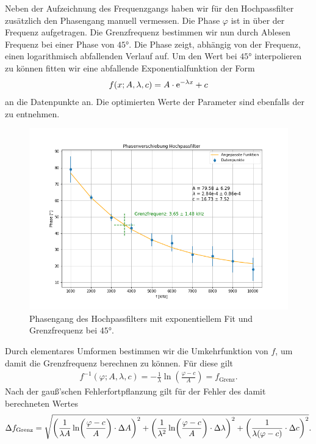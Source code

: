 Neben der Aufzeichnung des Frequenzgangs haben wir für den Hochpassfilter zusätzlich den Phasengang manuell vermessen. Die Phase $\varphi$ ist in  über der Frequenz aufgetragen. Die Grenzfrequenz bestimmen wir nun durch Ablesen Frequenz bei einer Phase von $45\si{\degree}$. Die Phase zeigt, abhängig von der Frequenz, einen logarithmisch abfallenden Verlauf auf. Um den Wert bei $45\si{\degree}$ interpolieren zu können fitten wir eine abfallende Exponentialfunktion der Form
\begin{align}
  f(x; A,\lambda,c) = A \cdot \text{e}^{- \lambda x} + c
\end{align}
an die Datenpunkte an. Die optimierten Werte der Parameter sind ebenfalls der  zu entnehmen.


\begin{figure}[H]
  \centering
  \includegraphics[width=.8\textwidth]{files/phaseshift_hp_fit.png}
  \caption{Phasengang des Hochpassfilters mit exponentiellem Fit und Grenzfrequenz bei $45\si{\degree}$.}
  \label{fig:phaseshift_hp_fit}
\end{figure}


Durch elementares Umformen bestimmen wir die Umkehrfunktion von $f$, um damit die Grenzfrequenz berechnen zu können. Für diese gilt
\begin{align}
  f^{-1}(\varphi; A, \lambda, c) = - \frac{1}{\lambda} \ln(\frac{\varphi - c}{A}) = f_{\mathrm{Grenz}}.
\end{align}
Nach der gauß'schen Fehlerfortpflanzung gilt für der Fehler des damit berechneten Wertes
\begin{align}
  \Delta f_{\mathrm{Grenz}} = \sqrt{\qty(\frac{1}{\lambda A} \ln(\frac{\varphi - c}{A}) \cdot \Delta A)^{2} + \qty(\frac{1}{\lambda^2} \ln(\frac{\varphi - c}{A}) \cdot \Delta \lambda)^{2} + \qty(\frac{1}{\lambda(\varphi - c)} \cdot \Delta c)^{2}}.
\end{align}

